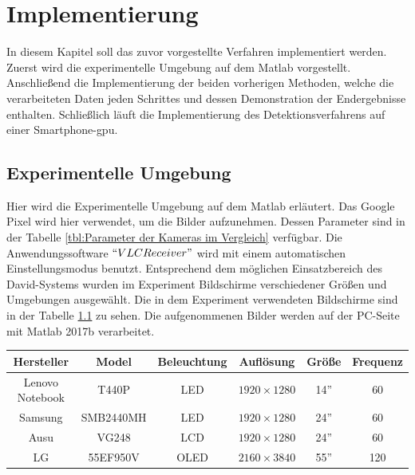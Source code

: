 \chapter{Implementierung} \label{cha:Implementierung}

In diesem Kapitel soll das zuvor vorgestellte Verfahren implementiert werden. Zuerst wird die experimentelle Umgebung auf dem Matlab vorgestellt. Anschließend die Implementierung der beiden vorherigen Methoden, welche die verarbeiteten Daten jeden Schrittes und dessen Demonstration der Endergebnisse enthalten. Schließlich läuft die Implementierung des Detektionsverfahrens auf einer Smartphone-\gls{gpu}.

\section{Experimentelle Umgebung}

Hier wird die Experimentelle Umgebung auf dem Matlab erläutert. Das Google Pixel wird hier verwendet, um die Bilder aufzunehmen. Dessen Parameter sind in der Tabelle \ref{tbl:Parameter der Kameras im Vergleich} verfügbar. Die Anwendungssoftware $ ``VLCReceiver" $ wird mit einem automatischen Einstellungsmodus benutzt. Entsprechend dem möglichen Einsatzbereich des David-Systems wurden im Experiment Bildschirme verschiedener Größen und Umgebungen ausgewählt. Die in dem Experiment verwendeten Bildschirme sind in der Tabelle \ref{tbl:Verwendeter Bildschirm} zu sehen. Die aufgenommenen Bilder werden auf der PC-Seite mit Matlab 2017b verarbeitet.

\begin{table}[htb]
	\label{tbl:Verwendeter Bildschirm}
	\footnotesize
	\centering
	\begin{tabular}{|c|c|c|c|c|c|}
	\toprule
	\textbf{Hersteller} & \textbf{Model} & \textbf{Beleuchtung} & \textbf{Auflösung} & \textbf{Größe}	& \textbf{Frequenz}\\
	\midrule
	Lenovo Notebook & T440P & LED & $ 1920 \times 1280$ & 14'' & 60 \\
	Samsung 	  & SMB2440MH   & LED & $ 1920 \times 1280$ & 24'' & 60 \\
	Ausu  		  & VG248   & LCD & $ 1920 \times 1280$ & 24'' & 60 \\
	LG  		  & 55EF950V & OLED & $ 2160 \times 3840$ & 55'' & 120 \\
	
	\bottomrule
	\end{tabular}
\end{table} 

